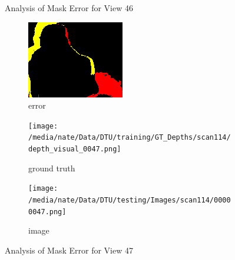 \documentclass{article}
\begin{document}
\begin{figure}
\begin{subfigure}{0.3\textwidth}
		\label{fig:img46}
	\end{subfigure}
	\hfill
	\caption{Analysis of Mask Error for View 46}
	\label{fig:error_analys46}
\end{figure}\begin{figure}
	\centering
	\begin{subfigure}{0.3\textwidth}
		\centering
		\includegraphics[width=\textwidth]{./output/047_error.png}
		\caption{error}
		\label{fig:error47}
	\end{subfigure}
	\hfill
	\centering
	\begin{subfigure}{0.3\textwidth}
		\centering
		\texttt{[image: /media/nate/Data/DTU/training/GT\_Depths/scan114/depth\_visual\_0047.png]}
		\caption{ground truth}
		\label{fig:gt47}
	\end{subfigure}
	\hfill
	\centering
	\begin{subfigure}{0.3\textwidth}
		\centering
		\texttt{[image: /media/nate/Data/DTU/testing/Images/scan114/00000047.png]}
		\caption{image}
		\label{fig:img47}
	\end{subfigure}
	\hfill
	\caption{Analysis of Mask Error for View 47}
	\label{fig:error_analys47}
\end{figure}\begin{figure}
	\centering
	\begin{subfigure}{0.3\textwidth}
		\centering

\end{subfigure}
\end{figure}
\end{document}
